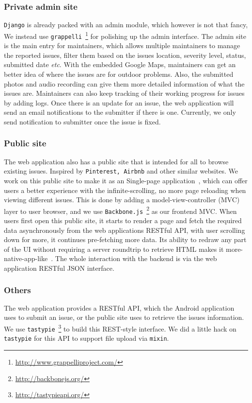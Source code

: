 \documentclass{acm_proc_article-sp}
\begin{document}
\subsubsection{Private admin site}
\texttt{Django} is already packed with an admin module, which however is not that fancy,
We instead use \texttt{grappelli}~\footnote{\url{http://www.grappelliproject.com/}} for polishing up the admin
interface. The admin site is the main entry for maintainers, which allows multiple maintainers to manage the reported issues, 
filter them based on the issues location, severity level, status, submitted date \textit{etc}.
With the embedded Google Maps, maintainers can get an better idea of where the issues are for outdoor problems.
Also, the submitted photos and audio recording can give them more detailed information of what the issues are.
Maintainers can also keep tracking of their working progress for issues by adding logs. Once there is an update for an issue, the web application
will send an email notifications to the submitter if there is one. Currently, we only send notification to submitter once the issue is fixed.
 
\subsubsection{Public site}
The web application also has a public site that is intended for all to browse existing issues.
Inspired by \texttt{Pinterest, Airbnb} and other similar websites. We work on this public site to make it as an Single-page application~\cite{wiki-spa}, 
which can offer users a better experience with the infinite-scrolling, no more page reloading when viewing different issues. 
This is done by adding a model-view-controller (MVC) layer to user browser, and we use \texttt{Backbone.js}~\footnote{\url{http://backbonejs.org/}} 
as our frontend MVC. When users first open this public site, it starts to render a page and fetch the required data asynchronously from the web applications RESTful
API, with user scrolling down for more, it continues pre-fetching more data. Its ability to redraw any part of the UI without requiring a server roundtrip to retrieve
HTML makes it more-native-app-like~\cite{spa-book}.
The whole interaction with the backend is via the web application RESTful JSON interface. 

\subsubsection{Others}
The web application provides a RESTful API, which the Android application uses to submit an issue, or the public site uses to retrieve the issues
information. We use \texttt{tastypie}~\footnote{\url{http://tastypieapi.org/}} to build this REST-style interface. We did a little hack on \texttt{tastypie}
for this API to support file upload via \texttt{mixin}.
\end{document}
